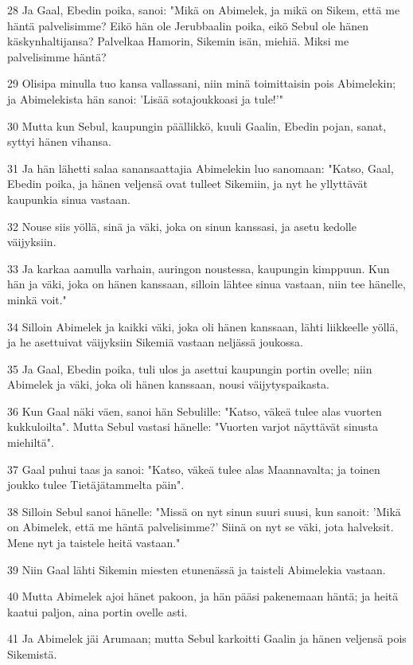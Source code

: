 \par 28 Ja Gaal, Ebedin poika, sanoi: "Mikä on Abimelek, ja mikä on Sikem, että me häntä palvelisimme? Eikö hän ole Jerubbaalin poika, eikö Sebul ole hänen käskynhaltijansa? Palvelkaa Hamorin, Sikemin isän, miehiä. Miksi me palvelisimme häntä?
\par 29 Olisipa minulla tuo kansa vallassani, niin minä toimittaisin pois Abimelekin; ja Abimelekista hän sanoi: 'Lisää sotajoukkoasi ja tule!'"
\par 30 Mutta kun Sebul, kaupungin päällikkö, kuuli Gaalin, Ebedin pojan, sanat, syttyi hänen vihansa.
\par 31 Ja hän lähetti salaa sanansaattajia Abimelekin luo sanomaan: "Katso, Gaal, Ebedin poika, ja hänen veljensä ovat tulleet Sikemiin, ja nyt he yllyttävät kaupunkia sinua vastaan.
\par 32 Nouse siis yöllä, sinä ja väki, joka on sinun kanssasi, ja asetu kedolle väijyksiin.
\par 33 Ja karkaa aamulla varhain, auringon noustessa, kaupungin kimppuun. Kun hän ja väki, joka on hänen kanssaan, silloin lähtee sinua vastaan, niin tee hänelle, minkä voit."
\par 34 Silloin Abimelek ja kaikki väki, joka oli hänen kanssaan, lähti liikkeelle yöllä, ja he asettuivat väijyksiin Sikemiä vastaan neljässä joukossa.
\par 35 Ja Gaal, Ebedin poika, tuli ulos ja asettui kaupungin portin ovelle; niin Abimelek ja väki, joka oli hänen kanssaan, nousi väijytyspaikasta.
\par 36 Kun Gaal näki väen, sanoi hän Sebulille: "Katso, väkeä tulee alas vuorten kukkuloilta". Mutta Sebul vastasi hänelle: "Vuorten varjot näyttävät sinusta miehiltä".
\par 37 Gaal puhui taas ja sanoi: "Katso, väkeä tulee alas Maannavalta; ja toinen joukko tulee Tietäjätammelta päin".
\par 38 Silloin Sebul sanoi hänelle: "Missä on nyt sinun suuri suusi, kun sanoit: 'Mikä on Abimelek, että me häntä palvelisimme?' Siinä on nyt se väki, jota halveksit. Mene nyt ja taistele heitä vastaan."
\par 39 Niin Gaal lähti Sikemin miesten etunenässä ja taisteli Abimelekia vastaan.
\par 40 Mutta Abimelek ajoi hänet pakoon, ja hän pääsi pakenemaan häntä; ja heitä kaatui paljon, aina portin ovelle asti.
\par 41 Ja Abimelek jäi Arumaan; mutta Sebul karkoitti Gaalin ja hänen veljensä pois Sikemistä.
